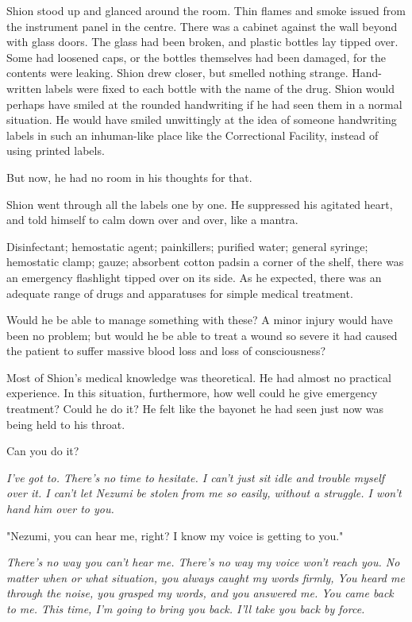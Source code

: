 Shion stood up and glanced around the room. Thin flames and smoke issued
from the instrument panel in the centre. There was a cabinet against the
wall beyond with glass doors. The glass had been broken, and plastic
bottles lay tipped over. Some had loosened caps, or the bottles
themselves had been damaged, for the contents were leaking. Shion drew
closer, but smelled nothing strange. Hand-written labels were fixed to
each bottle with the name of the drug. Shion would perhaps have smiled
at the rounded handwriting if he had seen them in a normal situation. He
would have smiled unwittingly at the idea of someone handwriting labels
in such an inhuman-like place like the Correctional Facility, instead of
using printed labels.

But now, he had no room in his thoughts for that.

Shion went through all the labels one by one. He suppressed his agitated
heart, and told himself to calm down over and over, like a mantra.

Disinfectant; hemostatic agent; painkillers; purified water; general
syringe; hemostatic clamp; gauze; absorbent cotton pads\el in a corner
of the shelf, there was an emergency flashlight tipped over on its side.
As he expected, there was an adequate range of drugs and apparatuses for
simple medical treatment.

Would he be able to manage something with these? A minor injury would
have been no problem; but would he be able to treat a wound so severe it
had caused the patient to suffer massive blood loss and loss of
consciousness?

Most of Shion's medical knowledge was theoretical. He had almost no
practical experience. In this situation, furthermore, how well could he
give emergency treatment? Could he do it? He felt like the bayonet he
had seen just now was being held to his throat.

Can you do it?

\emph{I've got to. There's no time to hesitate. I can't just sit idle and
trouble myself over it. I can't let Nezumi be stolen from me so easily,
without a struggle. I won't hand him over to you.}

"Nezumi, you can hear me, right? I know my voice is getting to you."

\emph{There's no way you can't hear me. There's no way my voice won't reach
you. No matter when or what situation, you always caught my words
firmly, You heard me through the noise, you grasped my words, and you
answered me. You came back to me. This time, I'm going to bring you
back. I'll take you back by force.}

